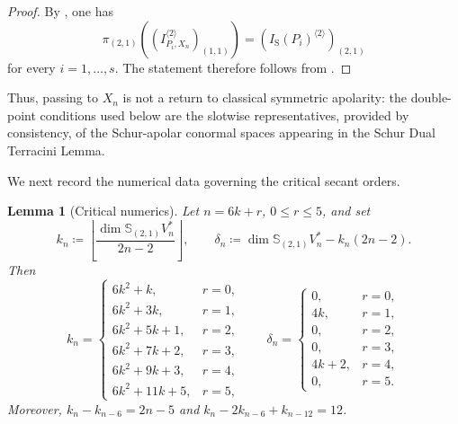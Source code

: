 \documentclass[a4paper,reqno]{amsart}
\theoremstyle{plainnopunct}
\newtheorem{lemma}[lemma]{Lemma}
\theoremstyle{definitionnopunct}
\renewcommand{\S}{\mathbb{S}}
\begin{document}
\begin{proof}
By , one has
\[
\pi_{(2,1)}
\left(
\left(
I_{P_i,X_n}^{\langle2\rangle}
\right)_{(1,1)}
\right)
=
\left(
I_{\mathrm S}(P_i)^{\langle2\rangle}
\right)_{(2,1)}
\]
for every $i=1,\ldots,s$. The statement therefore follows from
.
\end{proof}

{Thus, passing to $X_n$ is not a return to classical symmetric apolarity: the double-point conditions used below are the slotwise representatives, provided by consistency, of the Schur-apolar conormal spaces appearing in the Schur Dual Terracini Lemma.}

We next record the numerical data governing the critical secant
orders.

\begin{lemma}[Critical numerics]
\label{lemmanumerico}
Let
$n=6k+r$, $0\leq r\leq5$,
and set
\[
k_n
\coloneq
\left\lfloor
\frac{\dim\S_{(2,1)}V_n^*}{2n-2}
\right\rfloor,
\qquad
\delta_n
\coloneq
\dim\S_{(2,1)}V_n^*-k_n(2n-2).
\]
Then
\[
k_n
=
\begin{cases}
6k^2+k,       & r=0,\\
6k^2+3k,      & r=1,\\
6k^2+5k+1,    & r=2,\\
6k^2+7k+2,    & r=3,\\
6k^2+9k+3,    & r=4,\\
6k^2+11k+5,   & r=5,
\end{cases}
\qquad
\delta_n
=
\begin{cases}
0,       & r=0,\\
4k,      & r=1,\\
0,       & r=2,\\
0,       & r=3,\\
4k+2,    & r=4,\\
0,       & r=5.
\end{cases}
\]
Moreover,
$k_n-k_{n-6}
=
2n-5$
and
$
k_n-2k_{n-6}+k_{n-12}
=
12$.
\end{lemma}
\end{document}
